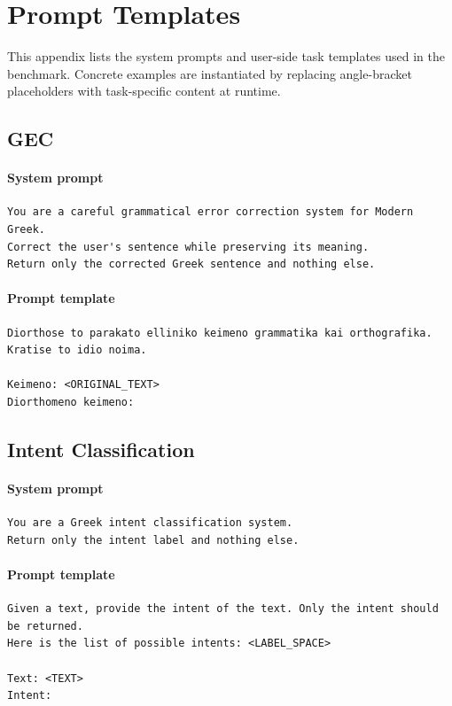 \documentclass[sigconf,review,anonymous]{acmart}
\newcommand{\resultsdir}{results/server_runs/completed_runs/20260410_legaldata_refresh_full_suite_default_models_capped500}
\newcommand{\assetsdir}{\resultsdir/article_assets}
\begin{document}


\section{Prompt Templates}
This appendix lists the system prompts and user-side task templates used in the benchmark. Concrete examples are instantiated by replacing angle-bracket placeholders with task-specific content at runtime.

\subsection{GEC}
\paragraph{System prompt}
\begin{verbatim}
You are a careful grammatical error correction system for Modern Greek.
Correct the user's sentence while preserving its meaning.
Return only the corrected Greek sentence and nothing else.
\end{verbatim}
\paragraph{Prompt template}
\begin{verbatim}
Diorthose to parakato elliniko keimeno grammatika kai orthografika.
Kratise to idio noima.

Keimeno: <ORIGINAL_TEXT>
Diorthomeno keimeno:
\end{verbatim}

\subsection{Intent Classification}
\paragraph{System prompt}
\begin{verbatim}
You are a Greek intent classification system.
Return only the intent label and nothing else.
\end{verbatim}
\paragraph{Prompt template}
\begin{verbatim}
Given a text, provide the intent of the text. Only the intent should be returned.
Here is the list of possible intents: <LABEL_SPACE>

Text: <TEXT>
Intent:
\end{verbatim}
\end{document}
